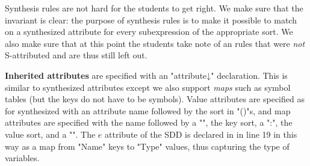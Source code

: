 \documentclass[11pt]{article} %
\begin{document}
  Synthesis rules are not hard for the students to get right.  We make sure that the invariant is
  clear: the purpose of synthesis rules is to make it possible to match on a synthesized attribute
  for every subexpression of the appropriate sort.  We also make sure that at this point the
  students take note of an rules that were \emph{not} S-attributed and are thus still left out.

\smallskip\noindent\textbf{Inherited attributes} are specified with an "attribute↓" declaration. This is similar to
  synthesized attributes except we also support \emph{maps} such as symbol tables (but the keys do
  not have to be symbols). Value attributes are specified as for synthesized with an attribute name
  followed by the sort in "()"s, and map attributes are specified with the name followed by a "{",
    the key sort, a ":", the value sort, and a "}".  The $e$ attribute of the SDD is declared in
  \HAX in line 19 in this way as a map from "Name" keys to "Type" values, thus capturing the type of
  variables.
\end{document}
